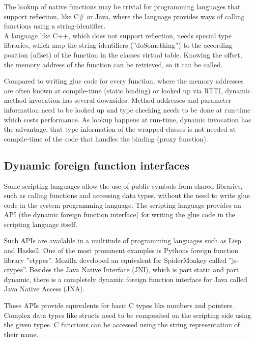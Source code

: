 The lookup of native functions may be trivial for programming languages that support reflection, like C\# or Java, where the language provides ways of calling functions using a string-identifier.\\
A language like C++, which does not support reflection, needs special type libraries, which map the string-identifiers (''doSomething'') to the according position (offset) of the function in the classes virtual table. Knowing the offset, the memory address of the function can be retrieved, so it can be called.

Compared to writing glue code for every function, where the memory addresses are often known at compile-time (static binding) or looked up via RTTI, dynamic method invocation has several downsides. Method addresses and parameter information need to be looked up and type checking needs to be done at run-time which costs performance. As lookup happens at run-time, dynamic invocation has the advantage, that type information of the wrapped classes is not needed at compile-time of the code that handles the binding (proxy function).

\subsection{Dynamic foreign function interfaces}

Some scripting languages allow the use of public symbols from shared libraries, such as calling functions and accessing data types, without the need to write glue code in the system programming language. The scripting language provides an API (the dynamic foreign function interface) for writing the glue code in the scripting language itself.

Such APIs are available in a multitude of programming languages such as Lisp and Haskell. One of the most prominent examples is Pythons foreign function library ''ctypes''. Mozilla developed an equivalent for SpiderMonkey called ''js-ctypes''. Besides the Java Native Interface (JNI), which is part static and part dynamic, there is a completely dynamic foreign function interface for Java called Java Native Access (JNA). 

These APIs provide equivalents for basic C types like numbers and pointers. Complex data types like structs need to be composited on the scripting side using the given types. C functions can be accessed using the string representation of their name.


